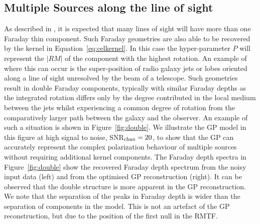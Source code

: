 \documentclass[fleqn,usenatbib]{mnras}
\begin{document}
\subsection{Multiple Sources along the line of sight}
\label{sec:multiple}

As described in \cite{Sun_2015}, it is expected that many lines of sight will have more than one Faraday thin component. Such Faraday geometries are also able to be recovered by the kernel in Equation~\ref{eq:celkernel}. In this case the hyper-parameter $P$ will represent the $|RM|$ of the component with the highest rotation. An example of where this can occur is the super-position of radio galaxy jets or lobes oriented along a line of sight unresolved by the beam of a telescope. Such geometries result in double Faraday components, typically with similar Faraday depths as the integrated rotation differs only by the degree contributed in the local medium between the jets whilst experiencing a common degree of rotation from the comparatively larger path between the galaxy and the observer. An example of such a situation is shown in Figure~\ref{fig:double}. We illustrate the GP model in this figure at high signal to noise, SNR$_{\rm chan} = 20$, to show that the GP can accurately represent the complex polarization behaviour of multiple sources without requiring additional kernel components. The Faraday depth spectra in Figure~\ref{fig:double} show the recovered Faraday depth spectrum from the noisy input data (left) and from the optimised GP reconstruction (right). It can be observed that the double structure is more apparent in the GP reconstruction. We note that the separation of the peaks in Faraday depth is wider than the separation of components in the model. This is not an artefact of the GP reconstruction, but due to the position of the first null in the RMTF. 
%
\end{document}
